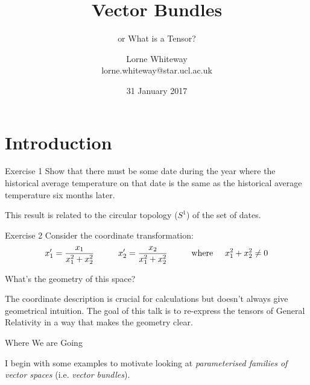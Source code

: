\documentclass{beamer}
\title[Vector Bundles] %
{Vector Bundles}
\subtitle{or What is a Tensor?}
\author{Lorne Whiteway \\ lorne.whiteway@star.ucl.ac.uk}
\date{31 January 2017}
\begin{document}

\begin{frame}
  \titlepage
\end{frame}

\section{Introduction}

\begin{frame}{Exercise 1}
Show that there must be some date during the year where the historical average temperature on that date is the same as the historical average temperature six months later.

This result is related to the circular topology ($S^1$) of the set of dates.
\end{frame}

\begin{frame}{Exercise 2}
Consider the coordinate transformation:
\begin{equation*}
x'_1 = \frac{x_1}{x_1^2 + x_2^2} \hspace{1cm} x'_2 = \frac{x_2}{x_1^2 + x_2^2} \hspace{1cm} \text{where} \hspace{0.5cm} x_1^2 + x_2^2 \neq 0
\end{equation*}

What's the geometry of this space?

The coordinate description is crucial for calculations but doesn't always give geometrical intuition. The goal of this talk is to re-express the tensors of General Relativity in a way that makes the geometry clear.

\end{frame}

\begin{frame}{Where We are Going}

I begin with some examples to motivate looking at \textit{parameterised families of vector spaces} (i.e. \textit{vector bundles}).

\end{frame}
\end{document}
